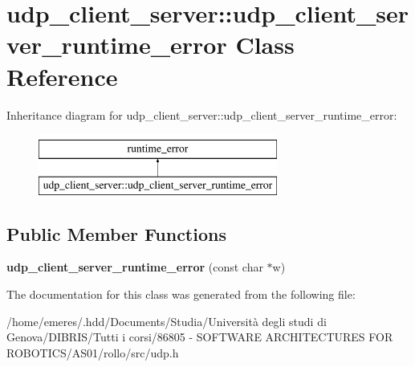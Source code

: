 \hypertarget{classudp__client__server_1_1udp__client__server__runtime__error}{}\section{udp\+\_\+client\+\_\+server\+:\+:udp\+\_\+client\+\_\+server\+\_\+runtime\+\_\+error Class Reference}
\label{classudp__client__server_1_1udp__client__server__runtime__error}
Inheritance diagram for udp\+\_\+client\+\_\+server\+:\+:udp\+\_\+client\+\_\+server\+\_\+runtime\+\_\+error\+:\begin{figure}[H]
\begin{center}
\leavevmode
\includegraphics[height=2.000000cm]{classudp__client__server_1_1udp__client__server__runtime__error}
\end{center}
\end{figure}
\subsection*{Public Member Functions}
\begin{DoxyCompactItemize}
\item 
\hypertarget{classudp__client__server_1_1udp__client__server__runtime__error_add3731a02166e43ef92ba4e031e046c6}{}{\bfseries udp\+\_\+client\+\_\+server\+\_\+runtime\+\_\+error} (const char $\ast$w)\label{classudp__client__server_1_1udp__client__server__runtime__error_add3731a02166e43ef92ba4e031e046c6}

\end{DoxyCompactItemize}


The documentation for this class was generated from the following file\+:\begin{DoxyCompactItemize}
\item 
/home/emeres/.\+hdd/\+Documents/\+Studia/\+Università degli studi di Genova/\+D\+I\+B\+R\+I\+S/\+Tutti i corsi/86805 -\/ S\+O\+F\+T\+W\+A\+R\+E A\+R\+C\+H\+I\+T\+E\+C\+T\+U\+R\+E\+S F\+O\+R R\+O\+B\+O\+T\+I\+C\+S/\+A\+S01/rollo/src/udp.\+h\end{DoxyCompactItemize}
